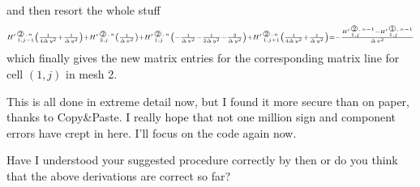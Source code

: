 and then resort the whole stuff
\[ {\scriptstyle 
      \HL{1,j-1}{2}{n} \left( \frac {1}{4\DYT} + \frac {1}{\DYT}    \right)
 +   \HL{2,j}{2}{n} \left( \frac {1}{\DXT} \right)
 +   \HL{1,j}{2}{n} \left( -\frac {1}{\DXT} - \frac {1}{2\DYT} - \frac {2}{\DYT}    \right)
 +    \HL{1,j+1}{2}{n} \left( \frac {1}{4\DYT}   + \frac {1}{\DYT}    \right)
    = -\frac{\HL{1,j}{2}{n-1} - \HL{1,j}{1}{n-1}}{\DXT} }
\]
which finally gives the new matrix entries for the corresponding matrix line for cell $(1,j)$ in mesh 2.

This is all done in extreme detail now, but I found it more secure than on paper, thanks to Copy\&Paste. I really hope that not one million sign and component errors have crept in here. I'll focus on the code again now.

Have I understood your suggested procedure correctly by then or do you think that the above derivations are correct so far?

